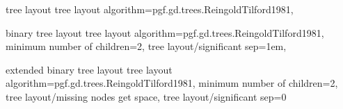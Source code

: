 

%
%
\pgfgddeclarealgorithmkey
  {tree layout}
  {tree layout}
  {
    algorithm=pgf.gd.trees.ReingoldTilford1981,
  }

%
%
\pgfgddeclarealgorithmkey
  {binary tree layout}
  {tree layout}
  {
    algorithm=pgf.gd.trees.ReingoldTilford1981,
    minimum number of children=2,
    tree layout/significant sep=1em,
  }

%
%
\pgfgddeclarealgorithmkey
  {extended binary tree layout}
  {tree layout}
  {
    algorithm=pgf.gd.trees.ReingoldTilford1981,
    minimum number of children=2,
    tree layout/missing nodes get space,
    tree layout/significant sep=0
  }





\endinput
